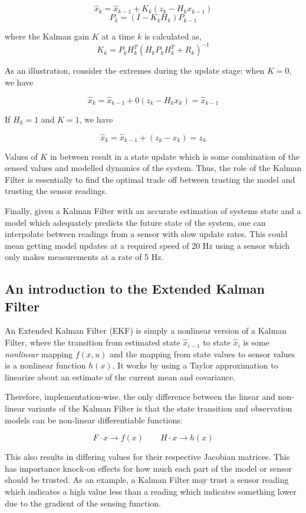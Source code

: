 \[ \hat{x}_k = \hat{x}_{k-1} + K_k (z_k - H_k x_{k-1}) \]
\[ P_k = (I - K_k H_k) P_{k-1} \]

where the Kalman gain $K$ at a time $k$ is calculated as,
\[ K_k = P_k H_k^T (H_k P_k H_k^T + R_k)^{-1} \]

As an illustration, consider the extremes during the update stage: when $K = 0$, we have

\[ \hat{x}_k = \hat{x}_{k-1} + 0 (z_k - H_k x_k) = \hat{x}_{k-1} \]

If $H_k = 1$ and $K = 1$, we have

\[ \hat{x}_k = \hat{x}_{k-1} + (z_k - x_k) = z_k \]

Values of $K$ in between result in a state update which is some combination of the sensed values and modelled dynamics of the system. Thus, the role of the Kalman Filter is essentially to find the optimal trade off between trusting the model and trusting the sensor readings.

Finally, given a Kalman Filter with an accurate estimation of systems state and a model which adequately predicts the future state of the system, one can interpolate between readings from a sensor with slow update rates. This could mean getting model updates at a required speed of 20 Hz using a sensor which only makes measurements at a rate of 5 Hz.



\subsection{An introduction to the Extended Kalman Filter}
An Extended Kalman Filter (EKF) is simply a nonlinear version of a Kalman Filter, where the transition from estimated state $\hat{x}_{i-1}$ to state $\hat{x}_i$ is some \emph{nonlinear} mapping $f(x, u)$ and the mapping from state values to sensor values is a nonlinear function $h(x)$. It works by using a Taylor approximation to linearize about an estimate of the current mean and covariance.

Therefore, implementation-wise, the only difference between the linear and non-linear variants of the Kalman Filter is that the state transition and observation models can be non-linear differentiable functions:

\[ F \cdot x \rightarrow f(x) \qquad H\cdot x \rightarrow h(x) \]

This also results in differing values for their respective Jacobian matrices. This has importance knock-on effects for how much each part of the model or sensor should be trusted. As an example, a Kalman Filter may trust a sensor reading which indicates a high value less than a reading which indicates something lower due to the gradient of the sensing function.

